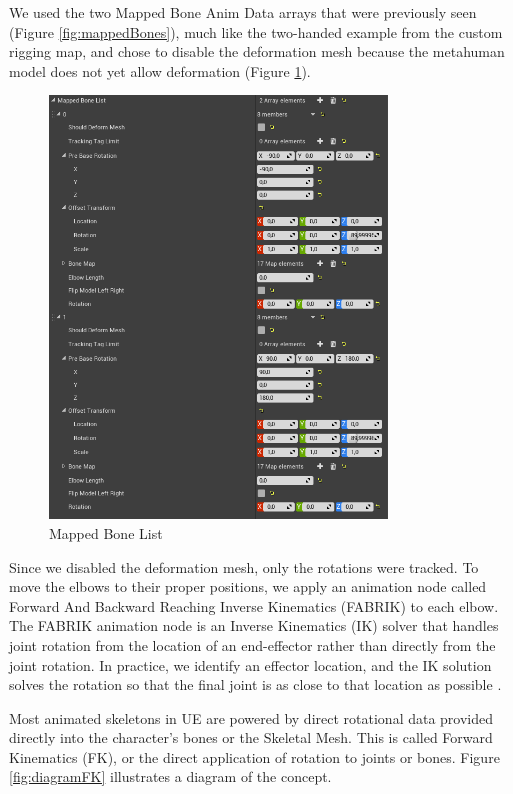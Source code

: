 We used the two Mapped Bone Anim Data arrays that were previously seen (Figure \ref{fig:mappedBones}), much like the two-handed example from the custom rigging map, and chose to disable the deformation mesh because the metahuman model does not yet allow deformation (Figure \ref{fig:mappedBoneList}).

\begin{figure}[!htb]
\includegraphics[width=0.8\textwidth]{figures/mappedBoneList.png}
\centering
\caption{Mapped Bone List}
\label{fig:mappedBoneList}
\end{figure}

Since we disabled the deformation mesh, only the rotations were tracked. To move the elbows to their proper positions, we apply an animation node called Forward And Backward Reaching Inverse Kinematics (FABRIK) to each elbow. The FABRIK animation node is an Inverse Kinematics (IK) solver that handles joint rotation from the location of an end-effector rather than directly from the joint rotation. In practice, we identify an effector location, and the IK solution solves the rotation so that the final joint is as close to that location as possible \cite{IK}.

Most animated skeletons in UE are powered by direct rotational data provided directly into the character's bones or the Skeletal Mesh. This is called Forward Kinematics (FK), or the direct application of rotation to joints or bones. Figure \ref{fig:diagramFK} illustrates a diagram of the concept.

